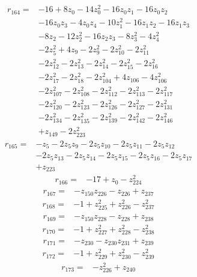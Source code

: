 \begin{align*}
r_{164}={}&-16 +8z_{0} -14z_{0}^{2} -16z_{0}z_{1} -16z_{0}z_{2}\\
&-16z_{0}z_{3} -4z_{0}z_{4} -10z_{1}^{2} -16z_{1}z_{2} -16z_{1}z_{3}\\
&-8z_{2} -12z_{2}^{2} -16z_{2}z_{3} -8z_{3}^{2} -4z_{4}^{2}\\
&-2z_{5}^{2} +4z_{9} -2z_{9}^{2} -2z_{10}^{2} -2z_{11}^{2}\\
&-2z_{12}^{2} -2z_{13}^{2} -2z_{14}^{2} -2z_{15}^{2} -2z_{16}^{2}\\
&-2z_{17}^{2} -2z_{18}^{2} -2z_{104}^{2} +4z_{106} -4z_{106}^{2}\\
&-2z_{107}^{2} -2z_{108}^{2} -2z_{112}^{2} -2z_{113}^{2} -2z_{117}^{2}\\
&-2z_{120}^{2} -2z_{123}^{2} -2z_{126}^{2} -2z_{127}^{2} -2z_{131}^{2}\\
&-2z_{134}^{2} -2z_{135}^{2} -2z_{139}^{2} -2z_{142}^{2} -2z_{146}^{2}\\
&+z_{149} -2z_{223}^{2}
\end{align*}
\begin{align*}
r_{165}={}&-z_{5} -2z_{5}z_{9} -2z_{5}z_{10} -2z_{5}z_{11} -2z_{5}z_{12}\\
&-2z_{5}z_{13} -2z_{5}z_{14} -2z_{5}z_{15} -2z_{5}z_{16} -2z_{5}z_{17}\\
&+z_{223}
\end{align*}
\begin{align*}
r_{166}={}&-17 +z_{0} -z_{224}^{2}
\end{align*}
\begin{align*}
r_{167}={}&-z_{150}z_{226} -z_{226} +z_{237}
\end{align*}
\begin{align*}
r_{168}={}&-1 +z_{225}^{2} +z_{226}^{2} -z_{237}^{2}
\end{align*}
\begin{align*}
r_{169}={}&-z_{150}z_{228} -z_{228} +z_{238}
\end{align*}
\begin{align*}
r_{170}={}&-1 +z_{227}^{2} +z_{228}^{2} -z_{238}^{2}
\end{align*}
\begin{align*}
r_{171}={}&-z_{230} -z_{230}z_{231} +z_{239}
\end{align*}
\begin{align*}
r_{172}={}&-1 +z_{229}^{2} +z_{230}^{2} -z_{239}^{2}
\end{align*}
\begin{align*}
r_{173}={}&-z_{226}^{2} +z_{240}
\end{align*}

